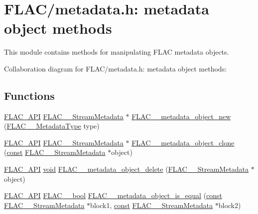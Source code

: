 \hypertarget{group__flac__metadata__object}{}\section{F\+L\+A\+C/metadata.h\+: metadata object methods}
\label{group__flac__metadata__object}


This module contains methods for manipulating F\+L\+AC metadata objects.  


Collaboration diagram for F\+L\+A\+C/metadata.h\+: metadata object methods\+:
\subsection*{Functions}
\begin{DoxyCompactItemize}
\item 
\hyperlink{group__flac__export_ga56ca07df8a23310707732b1c0007d6f5}{F\+L\+A\+C\+\_\+\+A\+PI} \hyperlink{struct_f_l_a_c_____stream_metadata}{F\+L\+A\+C\+\_\+\+\_\+\+Stream\+Metadata} $\ast$ \hyperlink{group__flac__metadata__object_ga0d21a62648d8c5321b4b47f8ee5a52f0}{F\+L\+A\+C\+\_\+\+\_\+metadata\+\_\+object\+\_\+new} (\hyperlink{group__flac__format_gac71714ba8ddbbd66d26bb78a427fac01}{F\+L\+A\+C\+\_\+\+\_\+\+Metadata\+Type} type)
\item 
\hyperlink{group__flac__export_ga56ca07df8a23310707732b1c0007d6f5}{F\+L\+A\+C\+\_\+\+A\+PI} \hyperlink{struct_f_l_a_c_____stream_metadata}{F\+L\+A\+C\+\_\+\+\_\+\+Stream\+Metadata} $\ast$ \hyperlink{group__flac__metadata__object_ga16b828b246e9af941e3e616e6bcd74c0}{F\+L\+A\+C\+\_\+\+\_\+metadata\+\_\+object\+\_\+clone} (\hyperlink{zconf_8h_a2c212835823e3c54a8ab6d95c652660e}{const} \hyperlink{struct_f_l_a_c_____stream_metadata}{F\+L\+A\+C\+\_\+\+\_\+\+Stream\+Metadata} $\ast$object)
\item 
\hyperlink{group__flac__export_ga56ca07df8a23310707732b1c0007d6f5}{F\+L\+A\+C\+\_\+\+A\+PI} \hyperlink{png_8h_ac9c84fa68bbad002983e35ce3663c686}{void} \hyperlink{group__flac__metadata__object_ga66bbe27dba68ba77be5af83986a280ea}{F\+L\+A\+C\+\_\+\+\_\+metadata\+\_\+object\+\_\+delete} (\hyperlink{struct_f_l_a_c_____stream_metadata}{F\+L\+A\+C\+\_\+\+\_\+\+Stream\+Metadata} $\ast$object)
\item 
\hyperlink{group__flac__export_ga56ca07df8a23310707732b1c0007d6f5}{F\+L\+A\+C\+\_\+\+A\+PI} \hyperlink{ordinals_8h_a95103469f1cbd78b8cf250194985b34e}{F\+L\+A\+C\+\_\+\+\_\+bool} \hyperlink{group__flac__metadata__object_gac834137d4837c304ca5db4c8407900bb}{F\+L\+A\+C\+\_\+\+\_\+metadata\+\_\+object\+\_\+is\+\_\+equal} (\hyperlink{zconf_8h_a2c212835823e3c54a8ab6d95c652660e}{const} \hyperlink{struct_f_l_a_c_____stream_metadata}{F\+L\+A\+C\+\_\+\+\_\+\+Stream\+Metadata} $\ast$block1, \hyperlink{zconf_8h_a2c212835823e3c54a8ab6d95c652660e}{const} \hyperlink{struct_f_l_a_c_____stream_metadata}{F\+L\+A\+C\+\_\+\+\_\+\+Stream\+Metadata} $\ast$block2)

\end{DoxyCompactItemize}
